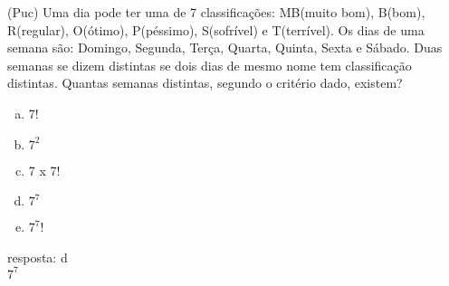\begin{ex}
 (Puc) Uma dia pode ter uma de 7 classificações: MB(muito bom), B(bom), R(regular), O(ótimo), P(péssimo), S(sofrível) e T(terrível). Os dias de uma semana são: Domingo, Segunda, Terça, Quarta, Quinta, Sexta e Sábado. Duas semanas se dizem distintas se dois dias de mesmo nome tem classificação distintas. Quantas semanas distintas, segundo o critério dado, existem?
    \begin{enumerate}[(a)]
    \item 7!
    \item $7^2$
    \item 7 x 7!
    \item $7^7$
    \item $7^7$!
    \end{enumerate}
      \begin{sol}
        resposta: d \\
        $7^7$
      \end{sol}
\end{ex}